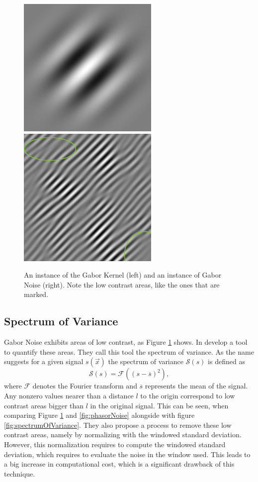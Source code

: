 \documentclass{utue} %
\begin{document}
\begin{figure}[ht]
  \centering
  \includegraphics[width=0.49\linewidth]{images/gaborKernel}
  \includegraphics[width=0.49\linewidth]{images/gaborNoise}
  \caption{An instance of the Gabor Kernel (left) and an instance of Gabor Noise (right). Note the low contrast areas, like the ones that are marked.}\label{fig:gaborNoise}

\end{figure}

\subsection{Spectrum of Variance}
Gabor Noise exhibits areas of low contrast, as Figure \ref{fig:gaborNoise} shows. In \cite{spectrumOfVariance} \citeauthor{spectrumOfVariance} develop a tool to quantify these areas. They call this tool the spectrum of variance. As the name suggests for a given signal $s(\vec{x})$ the spectrum of variance $\mathcal{S}(s)$ is defined as
$$
\mathcal{S}(s) = \mathcal{F}((s-\overline{s})^2),
$$
where $\mathcal{F}$ denotes the Fourier transform and $\overline{s}$ represents the mean of the signal. Any nonzero values nearer than a distance $l$ to the origin correspond to low contrast areas bigger than $l$ in the original signal. This can be seen, when comparing Figure \ref{fig:gaborNoise} and \ref{fig:phasorNoise} alongside with figure \ref{fig:spectrumOfVariance}. They also propose a process to remove these low contrast areas, namely by normalizing with the windowed standard deviation. However, this normalization requires to compute the windowed standard deviation, which requires to evaluate the noise in the window used. This leads to a big increase in computational cost, which is a significant drawback of this technique.
\end{document}
